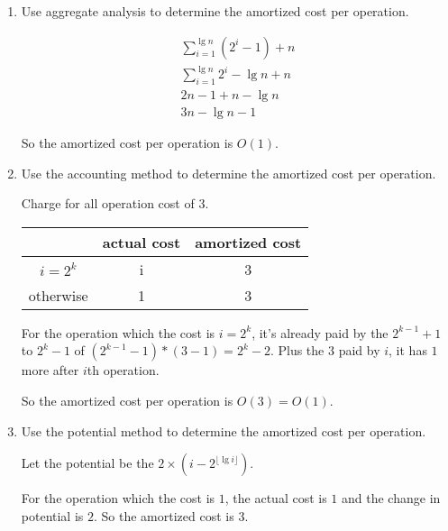 \documentclass[paper=a4, fontsize=11pt]{scrartcl} %
\begin{document}
\begin{enumerate}
\item
  \begin{fancyquotes}
    Use aggregate analysis to determine the amortized cost per operation.
  \end{fancyquotes}

  \begin{equation}
    \begin{split}
      \sum_{i=1}^{\lg{n}}{(2^{i}-1)} + n\\
      \sum_{i=1}^{\lg{n}}{2^{i}} - \lg{n} + n\\
      2n-1 + n -\lg{n}\\
      3n - \lg{n} -1
    \end{split}
  \end{equation}

  So the amortized cost per operation is $O(1)$.

\item
  \begin{fancyquotes}
    Use the accounting method to determine the amortized cost per operation.
  \end{fancyquotes}

  Charge for all operation cost of $3$.

  \begin{table}[H]
    \centering
    \begin{tabular}[hp]{ccc}
      & actual cost & amortized cost\\
      \hline
      $i = 2^k$ & i & 3\\
      otherwise & 1 & 3
    \end{tabular}
  \end{table}

  For the operation which the cost is $i = 2^k$, it's already paid by
  the $2^{k-1}+1$ to $2^{k}-1$ of $(2^{k-1}-1)*(3-1)=2^k-2$. Plus the
  $3$ paid by $i$, it has $1$ more after $i$th operation.

  So the amortized cost per operation is $O(3) = O(1)$.

\item
  \begin{fancyquotes}
    Use the potential method to determine the amortized cost per operation.
  \end{fancyquotes}

  Let the potential be the $2\times(i - 2^{\lfloor \lg{i}\rfloor})$.

  For the operation which the cost is $1$, the actual cost is $1$ and
  the change in potential is $2$. So the amortized cost is $3$.


\end{enumerate}
\end{document}
